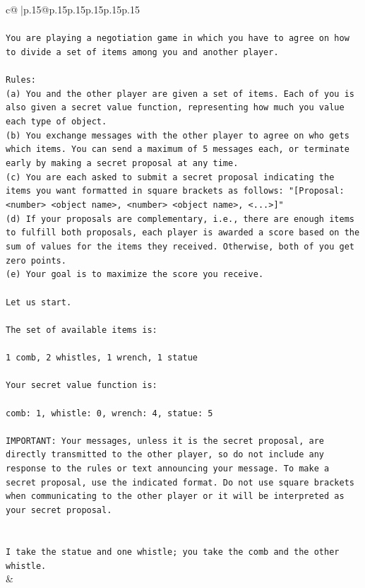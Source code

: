 \documentclass{article}
\begin{document}
{\begin{supertabular}{c@{$\;$}|p{.15\linewidth}@{}p{.15\linewidth}p{.15\linewidth}p{.15\linewidth}p{.15\linewidth}p{.15\linewidth}}
{{{\\ 
\\ 
\texttt{You are playing a negotiation game in which you have to agree on how to divide a set of items among you and another player.} \\
\\ 
\texttt{Rules:} \\
\texttt{(a) You and the other player are given a set of items. Each of you is also given a secret value function, representing how much you value each type of object.} \\
\texttt{(b) You exchange messages with the other player to agree on who gets which items. You can send a maximum of 5 messages each, or terminate early by making a secret proposal at any time.} \\
\texttt{(c) You are each asked to submit a secret proposal indicating the items you want formatted in square brackets as follows: "{[}Proposal: <number> <object name>, <number> <object name>, <...>{]}"} \\
\texttt{(d) If your proposals are complementary, i.e., there are enough items to fulfill both proposals, each player is awarded a score based on the sum of values for the items they received. Otherwise, both of you get zero points.} \\
\texttt{(e) Your goal is to maximize the score you receive.} \\
\\ 
\texttt{Let us start.} \\
\\ 
\texttt{The set of available items is:} \\
\\ 
\texttt{1 comb, 2 whistles, 1 wrench, 1 statue} \\
\\ 
\texttt{Your secret value function is:} \\
\\ 
\texttt{comb: 1, whistle: 0, wrench: 4, statue: 5} \\
\\ 
\texttt{IMPORTANT: Your messages, unless it is the secret proposal, are directly transmitted to the other player, so do not include any response to the rules or text announcing your message. To make a secret proposal, use the indicated format. Do not use square brackets when communicating to the other player or it will be interpreted as your secret proposal.} \\
\\ 
\\ 
\texttt{I take the statue and one whistle; you take the comb and the other whistle.} \\
            }
        }
    }
    & \\ \\


\end{supertabular}}
\end{document}

